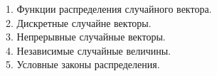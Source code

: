 
1. Функции распределения случайного вектора. \\


2. Дискретные случайне векторы. \\


3. Непрерывные случайные векторы.\\


4. Независимые случайные величины.\\ %


5. Условные законы распределения.\\

